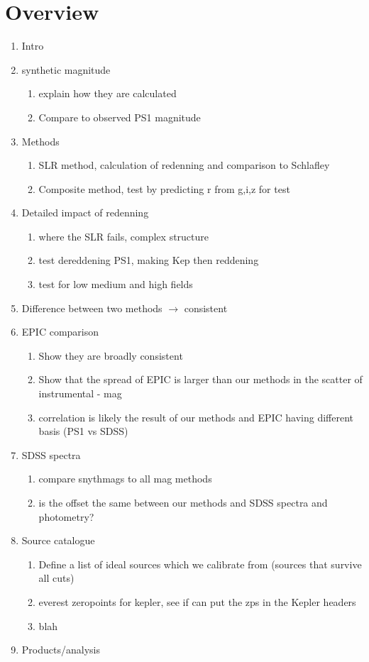 \documentclass{aastex63}
\begin{document}
\section{Overview}
\begin{enumerate}
    \item Intro
    \item synthetic magnitude 
    \begin{enumerate}
        \item explain how they are calculated
        \item Compare to observed PS1 magnitude 
    \end{enumerate}
    \item Methods
    \begin{enumerate}
        \item SLR method, calculation of redenning and comparison to Schlafley
        \item Composite method, test by predicting r from g,i,z for test
    \end{enumerate}
    \item Detailed impact of redenning
    \begin{enumerate}
        \item where the SLR fails, complex structure 
        \item test dereddening PS1, making Kep then reddening 
        \item test for low medium and high fields 
    \end{enumerate}
    \item Difference between two methods $\longrightarrow$ consistent 
    \item EPIC comparison
    \begin{enumerate}
        \item Show they are broadly consistent 
        \item Show that the spread of EPIC is larger than our methods in the scatter of instrumental - mag 
        \item correlation is likely the result of our methods and EPIC having different basis (PS1 vs SDSS)
    \end{enumerate}
    \item SDSS spectra
    \begin{enumerate}
        \item compare snythmags to all mag methods 
        \item is the offset the same between our methods and SDSS spectra and photometry?
    \end{enumerate}
    \item Source catalogue 
    \begin{enumerate}
        \item Define a list of ideal sources which we calibrate from (sources that survive all cuts)
        \item everest zeropoints for kepler, see if can put the zps in the Kepler headers
        \item blah
    \end{enumerate}
    \item Products/analysis
\end{enumerate}
\end{document}
